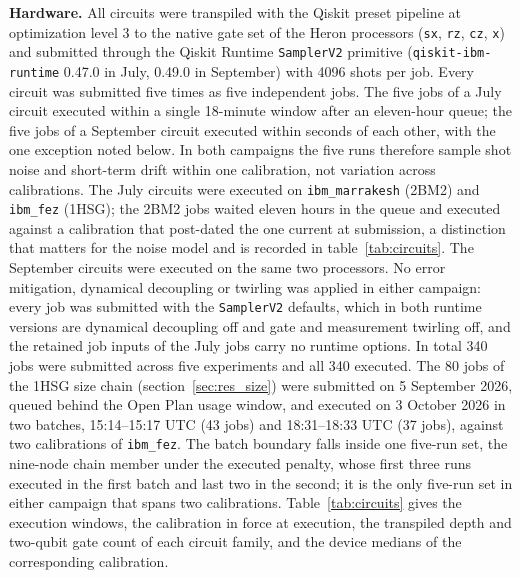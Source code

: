 \documentclass{iopjournal}
\begin{document}
\textbf{Hardware.} All circuits were transpiled with the Qiskit preset pipeline at optimization level 3 to the native gate set of the Heron processors (\texttt{sx}, \texttt{rz}, \texttt{cz}, \texttt{x}) and submitted through the Qiskit Runtime \texttt{SamplerV2} primitive (\texttt{qiskit-ibm-runtime} 0.47.0 in July, 0.49.0 in September) with 4096 shots per job. Every circuit was submitted five times as five independent jobs. The five jobs of a July circuit executed within a single 18-minute window after an eleven-hour queue; the five jobs of a September circuit executed within seconds of each other, with the one exception noted below. In both campaigns the five runs therefore sample shot noise and short-term drift within one calibration, not variation across calibrations. The July circuits were executed on \texttt{ibm\_marrakesh} (2BM2) and \texttt{ibm\_fez} (1HSG); the 2BM2 jobs waited eleven hours in the queue and executed against a calibration that post-dated the one current at submission, a distinction that matters for the noise model and is recorded in table~\ref{tab:circuits}. The September circuits were executed on the same two processors. No error mitigation, dynamical decoupling or twirling was applied in either campaign: every job was submitted with the \texttt{SamplerV2} defaults, which in both runtime versions are dynamical decoupling off and gate and measurement twirling off, and the retained job inputs of the July jobs carry no runtime options. In total 340 jobs were submitted across five experiments and all 340 executed. The 80 jobs of the 1HSG size chain (section~\ref{sec:res_size}) were submitted on 5 September 2026, queued behind the Open Plan usage window, and executed on 3 October 2026 in two batches, 15:14--15:17 UTC (43 jobs) and 18:31--18:33 UTC (37 jobs), against two calibrations of \texttt{ibm\_fez}. The batch boundary falls inside one five-run set, the nine-node chain member under the executed penalty, whose first three runs executed in the first batch and last two in the second; it is the only five-run set in either campaign that spans two calibrations. Table~\ref{tab:circuits} gives the execution windows, the calibration in force at execution, the transpiled depth and two-qubit gate count of each circuit family, and the device medians of the corresponding calibration.
\end{document}
